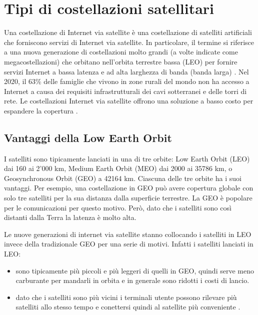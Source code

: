 
\chapter{Tipi di costellazioni satellitari}
\label{chp:intro}

Una costellazione di Internet via satellite è una costellazione di satelliti artificiali che forniscono servizi di Internet via satellite. In particolare, il termine si riferisce a una nuova generazione di costellazioni molto grandi (a volte indicate come megacostellazioni) che orbitano nell'orbita terrestre bassa (LEO) per fornire servizi Internet a bassa latenza e ad alta larghezza di banda (banda larga) \cite{jose_del_rosario_nsr_2018}.
Nel 2020, il 63\% delle famiglie che vivono in zone rurali del mondo non ha accesso a Internet a causa dei requisiti infrastrutturali dei cavi sotterranei e delle torri di rete. Le costellazioni Internet via satellite offrono una soluzione a basso costo per espandere la copertura \cite{makena_young_low_2022}.

\section{Vantaggi della Low Earth Orbit}

I satelliti sono tipicamente lanciati in una di tre orbite: Low Earth Orbit (LEO) dai 160 ai 2'000 km, Medium Earth Orbit (MEO) dai 2000 ai 35786 km, o Geosynchronous Orbit (GEO) a 42164 km.
Ciascuna delle tre orbite ha i suoi vantaggi.
Per esempio, una costellazione in GEO può avere copertura globale con solo tre satelliti per la sua distanza dalla superficie terrestre.
La GEO è popolare per le comunicazioni per questo motivo.
Però, dato che i satelliti sono così distanti dalla Terra la latenza è molto alta.

Le nuove generazioni di internet via satellite stanno collocando i satelliti in LEO invece della tradizionale GEO per una serie di motivi.
Infatti i satelliti lanciati in LEO:
\begin{itemize}
  \item sono tipicamente più piccoli e più leggeri di quelli in GEO, quindi serve meno carburante per mandarli in orbita e in generale sono ridotti i costi di lancio.
  \item dato che i satelliti sono più vicini i terminali utente possono rilevare più satelliti allo stesso tempo e conettersi quindi al satellite più conveniente \cite{makena_young_low_2022}.
\end{itemize}



